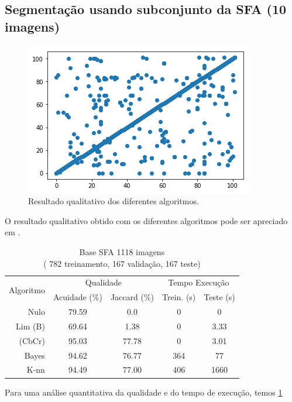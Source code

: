 \documentclass[conference]{IEEEtran}
\begin{document}
\subsection{Segmentação usando subconjunto da SFA (10 imagens)}
\begin{figure}[ht!]
\label{sfa10}
\begin{center}
\includegraphics[width=.95\columnwidth]{2040x2040.png}
\caption{Resultado qualitativo dos diferentes algoritmos.}
\end{center}
\end{figure}
O resultado qualitativo obtido com os diferentes algoritmos pode ser apreciado em .


\begin{table}[]
\centering
\caption{Base SFA 1118 imagens\\ ( 782 treinamento, 167 validação, 167 teste)}
\label{table_sfa1118}
\begin{tabular}{|r|c|c|c|c|}
\hline
\multicolumn{1}{|c|}{\multirow{2}{*}{Algoritmo}} & \multicolumn{2}{c|}{Qualidade} & \multicolumn{2}{c|}{Tempo Execução} \\ \cline{2-5} 
\multicolumn{1}{|c|}{} & Acuidade (\%) & Jaccard (\%) & Trein. (s) & Teste (s) \\ \hline
Nulo & 79.59 & 0.0 & 0 & 0 \\ \hline
Lim (B) & 69.64 & 1.38 & 0 & 3.33\\ \hline
(CbCr) & 95.03 & 77.78 & 0 & 3.01 \\ \hline
Bayes & 94.62 & 76.77 & 364 & 77 \\ \hline
K-nn & 94.49 & 77.00 & 406 & 1660 \\ \hline
\end{tabular}
\end{table}
Para uma análise quantitativa da qualidade e do tempo de execução, temos \ref{table_sfa1118}
\end{document}
